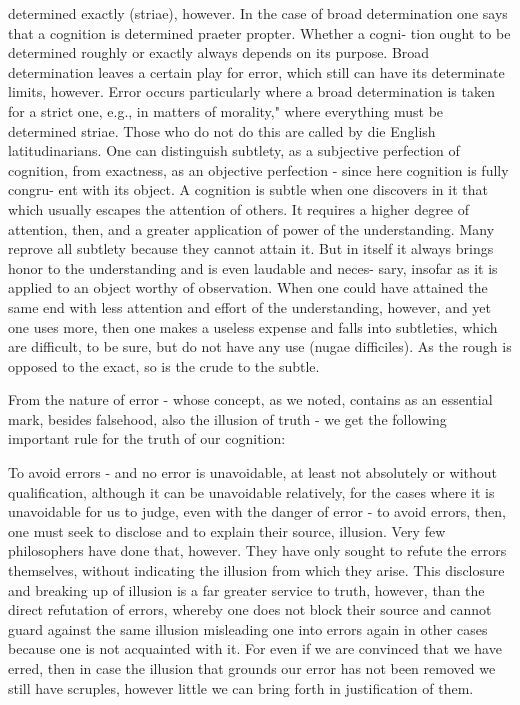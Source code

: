 determined exactly (striae), however.
In the case of broad determination
one says that a cognition is determined praeter propter. Whether a cogni-
tion ought to be determined roughly or exactly always depends on its
purpose. Broad determination leaves a certain play for error, which still
can have its determinate limits, however. Error occurs particularly where a
broad determination is taken for a strict one, e.g., in matters of morality,"
where everything must be determined striae. Those who do not do this are
called by die English latitudinarians.
One can distinguish subtlety, as a subjective perfection of cognition, from
exactness, as an objective perfection - since here cognition is fully congru-
ent with its object.
A cognition is subtle when one discovers in it that which usually escapes
the attention of others. It requires a higher degree of attention, then, and
a greater application of power of the understanding.
Many reprove all subtlety because they cannot attain it. But in itself it
always brings honor to the understanding and is even laudable and neces-
sary, insofar as it is applied to an object worthy of observation. When one
could have attained the same end with less attention and effort of the
understanding, however, and yet one uses more, then one makes a useless
expense and falls into subtleties, which are difficult, to be sure, but do not
have any use (nugae difficiles).
As the rough is opposed to the exact, so is the crude to the subtle.

From the nature of error - whose concept, as we noted, contains as an
essential mark, besides falsehood, also the illusion of truth - we get the
following important rule for the truth of our cognition:

To avoid errors - and no error is unavoidable, at least not absolutely or
without qualification, although it can be unavoidable relatively, for the
cases where it is unavoidable for us to judge, even with the danger of
error -
to avoid errors, then, one must seek to disclose and to explain
their source, illusion. Very few philosophers have done that, however.
They have only sought to refute the errors themselves, without indicating
the illusion from which they arise. This disclosure and breaking up of
illusion is a far greater service to truth, however, than the direct refutation
of errors, whereby one does not block their source and cannot guard
against the same illusion misleading one into errors again in other cases
because one is not acquainted with it. For even if we are convinced that we
have erred, then in case the illusion that grounds our error has not been
removed we still have scruples, however little we can bring forth
in justification of them.

